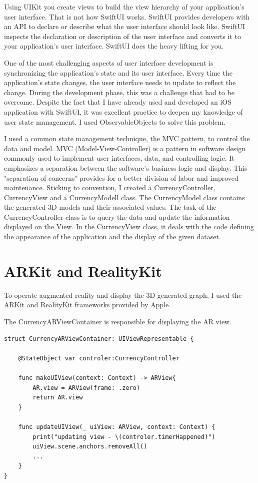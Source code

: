 \documentclass[11pt,a4paper,oneside]{report}
\begin{document}
Using UIKit you create views to build the view hierarchy of your application's user interface. That is not how SwiftUI works. SwiftUI provides developers with an API to declare or describe what the user interface should look like. SwiftUI inspects the declaration or description of the user interface and converts it to your application's user interface. SwiftUI does the heavy lifting for you.

One of the most challenging aspects of user interface development is synchronizing the application's state and its user interface. Every time the application's state changes, the user interface needs to update to reflect the change. During the development phase, this was a challenge that had to be overcome. Despite the fact that I have already used and developed an iOS application with SwiftUI, it was excellent practice to deepen my knowledge of user state management. I used ObservableObjects to solve this problem.

I used a common state management technique, the MVC pattern, to control the data and model. MVC (Model-View-Controller) is a pattern in software design commonly used to implement user interfaces, data, and controlling logic. It emphasizes a separation between the software's business logic and display. This "separation of concerns" provides for a better division of labor and improved maintenance. Sticking to convention, I created a CurrencyController, CurrencyView and a CurrencyModell class. The CurrencyModel class contains the generated 3D models and their associated values. The task of the CurrencyController class is to query the data and update the information displayed on the View. In the CurrencyView class, it deals with the code defining the appearance of the application and the display of the given dataset.


\section{ARKit and RealityKit}

To operate augmented reality and display the 3D generated graph, I used the ARKit and RealityKit frameworks provided by Apple.

The CurrencyARViewContainer is responsible for displaying the AR view.

\begin{lstlisting}
struct CurrencyARViewContainer: UIViewRepresentable {
    
    @StateObject var controler:CurrencyController
    
    func makeUIView(context: Context) -> ARView{
        AR.view = ARView(frame: .zero)
        return AR.view
    }
    
    func updateUIView(_ uiView: ARView, context: Context) {
        print("updating view - \(controler.timerHappened)")
        uiView.scene.anchors.removeAll()
        ...
    }
}
\end{lstlisting}
\end{document}
